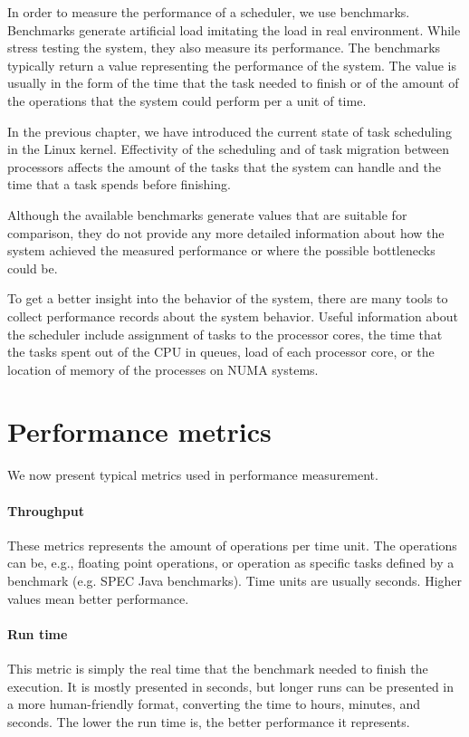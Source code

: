 In order to measure the performance of a scheduler, we use benchmarks.
Benchmarks generate artificial load imitating the load in real environment.
While stress testing the system, they also measure its performance. The benchmarks
typically return a value representing the performance of the system. The value
is usually in the form of the time that the task needed to finish or of the amount of
the operations that the system could perform per a unit of time.

In the previous chapter, we have introduced the current state of task scheduling in
the Linux kernel.
Effectivity of the scheduling and of task migration between processors affects
the amount of the tasks that the system can handle and the time that a task
spends before finishing.

Although the available benchmarks generate values that are suitable for comparison, they
do not provide any more detailed information about how the system achieved the
measured performance or where the possible bottlenecks could
be\;\cite{active-benchmarking}.

To get a better insight into the behavior of the system, there are many tools to
collect performance records about the system behavior. Useful information about the
scheduler include assignment of tasks to the processor cores, the time that the
tasks spent out of the CPU in queues, load of each processor core, or the
location of memory of the processes on NUMA systems.

\section{Performance metrics} \label{sec:metrics}
We now present typical metrics used in performance measurement.

\paragraph{Throughput} These metrics represents the amount of operations per time
unit. The operations can be, e.g., floating point operations, or operation as
specific tasks defined by a benchmark (e.g. SPEC Java benchmarks). Time units are usually
seconds. Higher values mean better performance.

\paragraph{Run time} This metric is simply the real time that the benchmark needed to finish the
execution. It is mostly presented in seconds, but longer runs can be presented
in a more human-friendly format, converting the time to hours, minutes, and seconds. The
lower the run time is, the better performance it represents.


